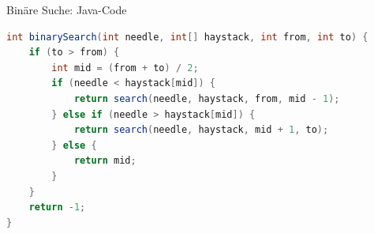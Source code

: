 \documentclass[18pt]{beamer}
\begin{document}
\begin{frame}[fragile]{Binäre Suche: Java-Code}
    \begin{exampleblock}{}
        \begin{lstlisting}[language=Java,basicstyle=\scriptsize]
int binarySearch(int needle, int[] haystack, int from, int to) {
    if (to > from) {
        int mid = (from + to) / 2;
        if (needle < haystack[mid]) {
            return search(needle, haystack, from, mid - 1);
        } else if (needle > haystack[mid]) {
            return search(needle, haystack, mid + 1, to);
        } else {
            return mid;
        }
    }
    return -1;
}
        \end{lstlisting}
    \end{exampleblock}
\end{frame}
\end{document}

